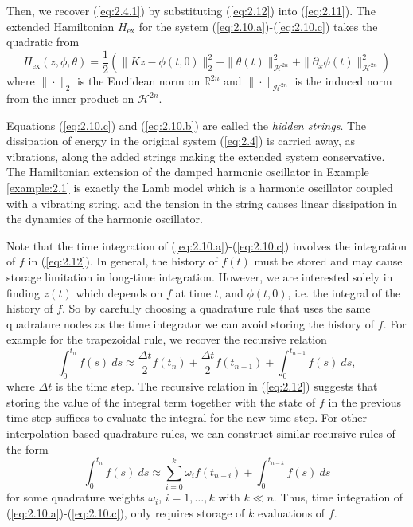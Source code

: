 Then, we recover (\ref{eq:2.4.1}) by substituting (\ref{eq:2.12}) into (\ref{eq:2.11}). The extended Hamiltonian $H_\text{ex}$ for the system (\ref{eq:2.10.a})-(\ref{eq:2.10.c}) takes the quadratic from
\begin{equation} \label{eq:2.13}
	H_\text{ex}(z,\phi,\theta) = \frac 1 2 \left( \| Kz - \phi(t,0) \|_2^2 + \| \theta(t) \|^2_{\mathcal H^{2n} } + \| \partial_x\phi(t)\|^2_{\mathcal H^{2n} }\right)
\end{equation}
where $\| \cdot \|_2$ is the Euclidean norm on $\mathbb R^{2n}$ and $\| \cdot \|_{\mathcal H^{2n}}$ is the induced norm from the inner product on $\mathcal H^{2n}$. 

Equations (\ref{eq:2.10.c}) and (\ref{eq:2.10.b}) are called the \emph{hidden strings}. The dissipation of energy in the original system (\ref{eq:2.4}) is carried away, as vibrations, along the added strings making the extended system conservative. The Hamiltonian extension of the damped harmonic oscillator in Example \ref{example:2.1} is exactly the Lamb model \cite{lamb:1900} which is a harmonic oscillator coupled with a vibrating string, and the tension in the string causes linear dissipation in the dynamics of the harmonic oscillator.

Note that the time integration of (\ref{eq:2.10.a})-(\ref{eq:2.10.c}) involves the integration of $f$ in (\ref{eq:2.12}). In general, the history of $f(t)$ must be stored and may cause storage limitation in long-time integration. However, we are interested solely in finding $z(t)$ which depends on $f$ at time $t$, and $\phi(t,0)$, i.e. the integral of the history of $f$. So by carefully choosing a quadrature rule that uses the same quadrature nodes as the time integrator we can avoid storing the history of $f$. For example for the trapezoidal rule, we recover the recursive relation
\begin{equation} \label{eq:2.14}
	\int_{0}^{t_n} f(s) \ ds \approx \frac{\Delta t}{2} f(t_n) + \frac{\Delta t}{2} f(t_{n-1}) + \int_{0}^{t_{n-1}} f(s) \ ds,
\end{equation}
where $\Delta t$ is the time step. The recursive relation in (\ref{eq:2.12}) suggests that storing the value of the integral term together with the state of $f$ in the previous time step suffices to evaluate the integral for the new time step. For other interpolation based quadrature rules, we can construct similar recursive rules of the form
\begin{equation}
	\int_{0}^{t_n} f(s) \ ds \approx \sum_{i=0}^{k} \omega_i f(t_{n-i})  + \int_{0}^{t_{n-k}} f(s) \ ds
\end{equation}
for some quadrature weights $\omega_i$, $i=1,\dots,k$ with $k\ll n$. Thus, time integration of (\ref{eq:2.10.a})-(\ref{eq:2.10.c}), only requires storage of $k$ evaluations of $f$.
